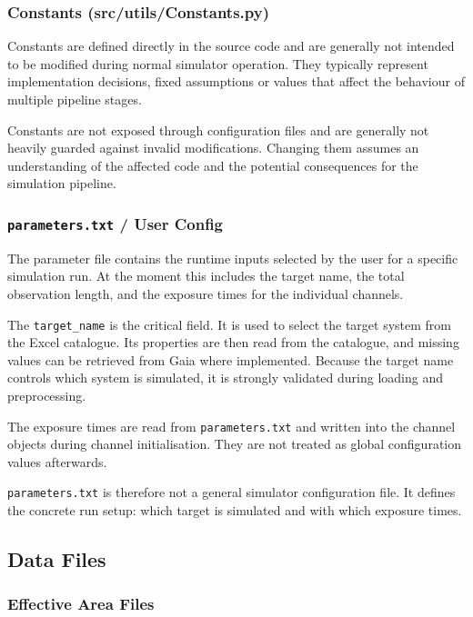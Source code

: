 \subsubsection{Constants (src/utils/Constants.py)}

Constants are defined directly in the source code and are generally not intended to be modified during normal simulator operation. They typically represent implementation decisions, fixed assumptions or values that affect the behaviour of multiple pipeline stages.

Constants are not exposed through configuration files and are generally not heavily guarded against invalid modifications. Changing them assumes an understanding of the affected code and the potential consequences for the simulation pipeline.

\subsubsection{\texttt{parameters.txt} / User Config}
\label{sec:user_cfg}
The parameter file contains the runtime inputs selected by the user for a specific simulation run. At the moment this includes the target name, the total observation length, and the exposure times for the individual channels.

The \texttt{target\_name} is the critical field. It is used to select the target system from the Excel catalogue. Its properties are then read from the catalogue, and missing values can be retrieved from Gaia where implemented. Because the target name controls which system is simulated, it is strongly validated during loading and preprocessing.

The exposure times are read from \texttt{parameters.txt} and written into the channel objects during channel initialisation. They are not treated as global configuration values afterwards.

\texttt{parameters.txt} is therefore not a general simulator configuration file. It defines the concrete run setup: which target is simulated and with which exposure times.

\subsection{Data Files}

\subsubsection{Effective Area Files}

